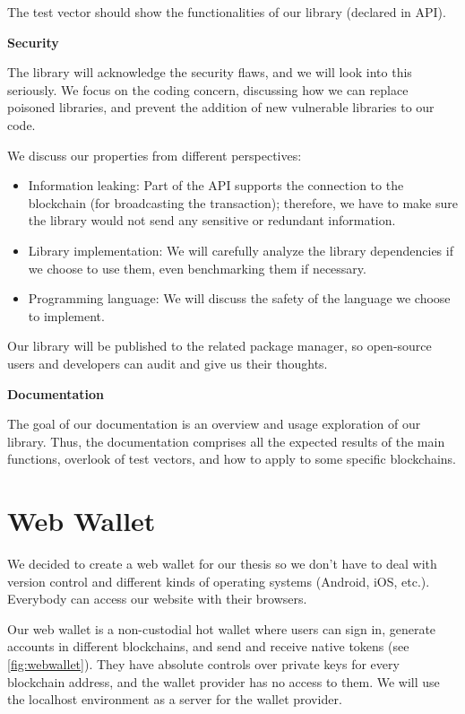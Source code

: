 The test vector should show the functionalities of our library (declared in API).

\bigskip
{\textbf{Security}}

The library will acknowledge the security flaws, and we will look into this seriously. We focus on the coding concern, discussing how we can replace poisoned libraries, and prevent the addition of new vulnerable libraries to our code.

We discuss our properties from different perspectives:

\begin{itemize}
    \item Information leaking: Part of the API supports the connection to the blockchain (for broadcasting the transaction); therefore, we have to make sure the library would not send any sensitive or redundant information.
    \item Library implementation: We will carefully analyze the library dependencies if we choose to use them, even benchmarking them if necessary.
    \item Programming language: We will discuss the safety of the language we choose to implement.
\end{itemize}

Our library will be published to the related package manager, so open-source users and developers can audit and give us their thoughts.

\bigskip
{\textbf{Documentation}}

The goal of our documentation is an overview and usage exploration of our library. Thus, the documentation comprises all the expected results of the main functions, overlook of test vectors, and how to apply to some specific blockchains.



\section{Web Wallet}
We decided to create a web wallet for our thesis so we don’t have to deal with version control and different kinds of operating systems (Android, iOS, etc.). Everybody can access our website with their browsers.

Our web wallet is a non-custodial hot wallet where users can sign in, generate accounts in different blockchains, and send and receive native tokens (see \autoref{fig:webwallet}). They have absolute controls over private keys for every blockchain address, and the wallet provider has no access to them. We will use the localhost environment as a server for the wallet provider.

